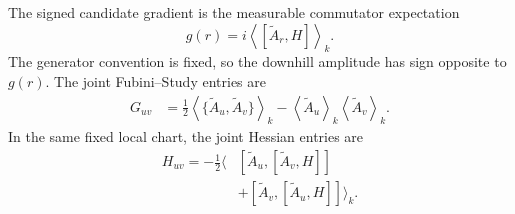 \documentclass[
  reprint,
  amsmath,
  amssymb,
  aps,
  pra,
  nofootinbib,
  superscriptaddress,
  floatfix
]{revtex4-2}
\begin{document}
The signed candidate gradient is the measurable commutator expectation
\begin{equation}
g(r)=i\left\langle[\widetilde A_r,H]\right\rangle_k.
\label{eq:record_gradient}
\end{equation}
The generator convention is fixed, so the downhill amplitude has sign opposite
to \(g(r)\). The joint Fubini--Study entries are
\begin{equation}
\begin{aligned}
G_{uv}
&=\frac12\left\langle
\{\widetilde A_u,\widetilde A_v\}
\right\rangle_k
-\left\langle\widetilde A_u\right\rangle_k
 \left\langle\widetilde A_v\right\rangle_k .
\end{aligned}
\label{eq:joint_gram_observable}
\end{equation}
In the same fixed local chart, the joint Hessian entries are
\begin{equation}
\begin{aligned}
H_{uv}
=-\frac12\Big\langle
&[\widetilde A_u,[\widetilde A_v,H]]\\
&+[\widetilde A_v,[\widetilde A_u,H]]
\Big\rangle_k .
\end{aligned}
\label{eq:joint_hessian_observable}
\end{equation}
\end{document}
